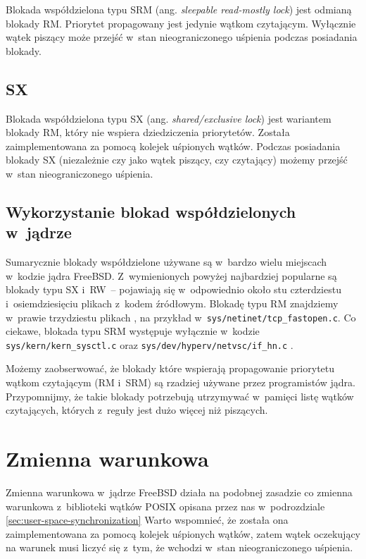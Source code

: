 \documentclass[shortabstract]{iithesis}
\theoremstyle{definition} \newtheorem*{definition}{Definicja}
\theoremstyle{definition} \newtheorem*{example}{Przykład}
\theoremstyle{definition} \newtheorem*{remark}{Uwaga}
\begin{document}
Blokada współdzielona typu SRM (ang. \textit{sleepable read-mostly lock}) jest odmianą blokady RM.
Priorytet propagowany jest jedynie wątkom czytającym. Wyłącznie wątek piszący może przejść w~stan
nieograniczonego uśpienia podczas posiadania blokady.

\subsection{SX}

Blokada współdzielona typu SX (ang. \textit{shared/exclusive lock}) jest wariantem blokady RM, który nie
wspiera dziedziczenia priorytetów. Została zaimplementowana za pomocą kolejek uśpionych wątków.
Podczas posiadania blokady SX (niezależnie czy jako wątek piszący,
czy czytający) możemy przejść w~stan nieograniczonego uśpienia.

\subsection{Wykorzystanie blokad współdzielonych w~jądrze}

Sumarycznie blokady współdzielone używane są w~bardzo wielu miejscach w~kodzie jądra FreeBSD.
Z~wymienionych powyżej najbardziej popularne są blokady typu SX i~RW~-- pojawiają się w~odpowiednio około stu
czterdziestu \cite{bib:bxr-sx1} \cite{bib:bxr-sx2} i~osiemdziesięciu \cite{bib:bxr-rw1} \cite{bib:bxr-rw2}
plikach z~kodem źródłowym. Blokadę typu RM znajdziemy w~prawie trzydziestu plikach \cite{bib:bxr-rm1}
\cite{bib:bxr-rm2}, na przykład w~\texttt{sys/netinet/tcp\_fastopen.c}.
Co ciekawe, blokada typu SRM występuje wyłącznie w~kodzie
\texttt{sys/kern/kern\_sysctl.c} oraz \texttt{sys/dev/hyperv/netvsc/if\_hn.c} \cite{bib:bxr-srm}.

Możemy zaobserwować, że blokady które wspierają propagowanie priorytetu wątkom czytającym (RM i~SRM) są
rzadziej używane przez programistów jądra. Przypomnijmy, że takie blokady potrzebują utrzymywać w~pamięci listę
wątków czytających, których z~reguły jest dużo więcej niż piszących.

\section{Zmienna warunkowa}

Zmienna warunkowa w~jądrze FreeBSD działa na podobnej zasadzie co zmienna warunkowa z~biblioteki
wątków POSIX opisana przez nas w~podrozdziale \ref{sec:user-space-synchronization}
Warto wspomnieć, że została ona zaimplementowana za pomocą kolejek uśpionych wątków, zatem
wątek oczekujący na warunek musi liczyć się z~tym, że wchodzi w~stan nieograniczonego uśpienia.
\end{document}
